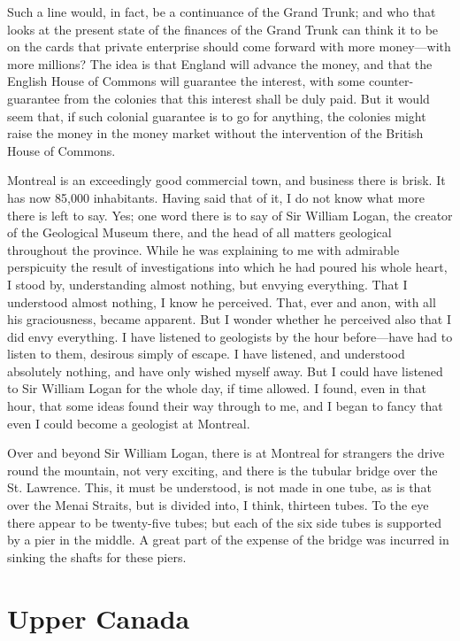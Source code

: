 Such a line would, in fact, be a continuance of the Grand Trunk;
and who that looks at the present state of the finances of the
Grand Trunk can think it to be on the cards that private enterprise
should come forward with more money---with more millions?  The idea
is that England will advance the money, and that the English House
of Commons will guarantee the interest, with some counter-guarantee
from the colonies that this interest shall be duly paid.  But it
would seem that, if such colonial guarantee is to go for anything,
the colonies might raise the money in the money market without the
intervention of the British House of Commons.

Montreal is an exceedingly good commercial town, and business there
is brisk.  It has now 85,000 inhabitants.  Having said that of it,
I do not know what more there is left to say.  Yes; one word there
is to say of Sir William Logan, the creator of the Geological
Museum there, and the head of all matters geological throughout the
province.  While he was explaining to me with admirable perspicuity
the result of investigations into which he had poured his whole
heart, I stood by, understanding almost nothing, but envying
everything.  That I understood almost nothing, I know he perceived.
That, ever and anon, with all his graciousness, became apparent.
But I wonder whether he perceived also that I did envy everything.
I have listened to geologists by the hour before---have had to
listen to them, desirous simply of escape.  I have listened, and
understood absolutely nothing, and have only wished myself away.
But I could have listened to Sir William Logan for the whole day,
if time allowed.  I found, even in that hour, that some ideas found
their way through to me, and I began to fancy that even I could
become a geologist at Montreal.

Over and beyond Sir William Logan, there is at Montreal for
strangers the drive round the mountain, not very exciting, and
there is the tubular bridge over the St. Lawrence.  This, it must
be understood, is not made in one tube, as is that over the Menai
Straits, but is divided into, I think, thirteen tubes.  To the eye
there appear to be twenty-five tubes; but each of the six side
tubes is supported by a pier in the middle.  A great part of the
expense of the bridge was incurred in sinking the shafts for these
piers.



\chapter{Upper Canada}


